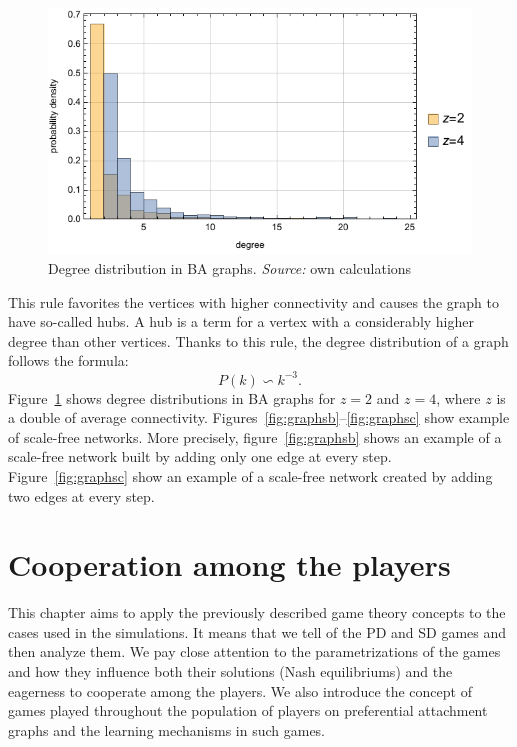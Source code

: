\documentclass[english, twoside, 12pt, a4paper]{article}
\theoremstyle{definition}
\theoremstyle{plain}
\theoremstyle{remark}
\begin{document}
\begin{figure}
\centering

\includegraphics[width=.4\textwidth]{../ramsza/figs/dist.pdf}

\captionsetup{margin=10pt,font=small,labelfont=bf,width=.42\textwidth}

  \caption[Degree disribution]{Degree distribution in BA graphs. \textit{Source:} own calculations}\label{fig:dist}


\end{figure}

This rule favorites the vertices with higher connectivity and causes the graph to have so-called hubs. A hub is a term for a vertex with a considerably higher degree than other vertices. Thanks to this rule, the degree distribution of a graph follows the formula:
\[
P(k) \backsim k^{-3}.
\]
Figure~\ref{fig:dist} shows degree distributions in BA graphs for \(z = 2\) and \( z = 4\), where \(z\) is a double of average connectivity. Figures~\ref{fig:graphsb}--\ref{fig:graphsc} show example of scale-free networks. More precisely, figure~\ref{fig:graphsb} shows an example of a scale-free network built by adding only one edge at every step. Figure~\ref{fig:graphsc} show an example of a scale-free network created by adding two edges at every step. 




\clearpage
\section{Cooperation among the players}\label{sec:coop}

This chapter aims to apply the previously described game theory concepts to the cases used in the simulations. It means that we tell of the PD and SD games and then analyze them. We pay close attention to the parametrizations of the games and how they influence both their solutions (Nash equilibriums) and the eagerness to cooperate among the players.
We also introduce the concept of games played throughout the population of players on preferential attachment graphs and the learning mechanisms in such games. 
\end{document}
